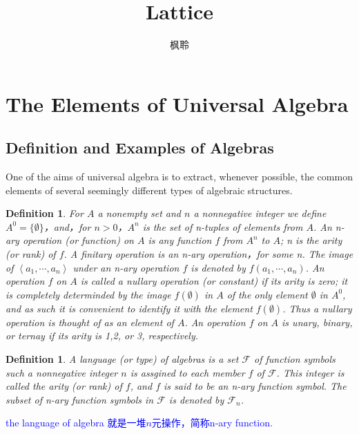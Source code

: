 \documentclass{article}
\newtheorem{definition}[theorem]{Definition}
\newcommand{\bluet}[1]{\textcolor{blue}{#1}}
\begin{document}
\title{Lattice}
\author{枫聆}
\maketitle
\tableofcontents
\newpage
\section{The Elements of Universal Algebra}
\subsection{Definition and Examples of Algebras}
{\color{red}
One of the aims of universal algebra is to extract, whenever possible, the common elements
of several seemingly different types of algebraic structures}.

\begin{definition}
\rm For $A$ a nonempty set and $n$ a nonnegative integer we define $A^{0} = \{\emptyset\}$，and，for $n > 0$，$A^n$ is the set of n-tuples of elements from $A$. An {\color{red} n-ary operation} (or function) on $A$ is any function $f$ from $A^n$ to $A$; n is the {\color{red} arity} (or rank) of $f$. A {\color{red} finitary operation} is an n-ary operation，for some n. The image of $\left< a_1, \cdots , a_n \right>$ under an n-ary operation $f$ is denoted by $f(a_1,\cdots,a_n)$. An operation $f$ on $A$ is called a {\color{red} nullary operation} (or constant) if its arity is zero; it is completely determinded by the image $f(\emptyset)$ in $A$ of the only element $\emptyset$ in $A^0$, and as such it is convenient to identify it with the element $f(\emptyset)$. Thus a nullary operation is thought of as an element of $A$. An operation $f$ on $A$ is {\color{red} unary, binary, or ternay} if its arity is 1,2, or 3, respectively.
\end{definition}


\begin{definition}
\rm A {\color{red} language} (or type) of algebras is a set $\mathcal{F}$ of function symbols such a nonnegative integer $n$ is assgined to each member $f$ of $\mathcal{F}$. This integer is called the arity (or rank) of $f$, and $f$ is said to be an n-ary function symbol. The subset of n-ary function symbols in $\mathcal{F}$ is denoted by $\mathcal{F}_n$.
\end{definition}

\bluet{the language of algebra 就是一堆$n$元操作，简称n-ary function}. 
\end{document}
